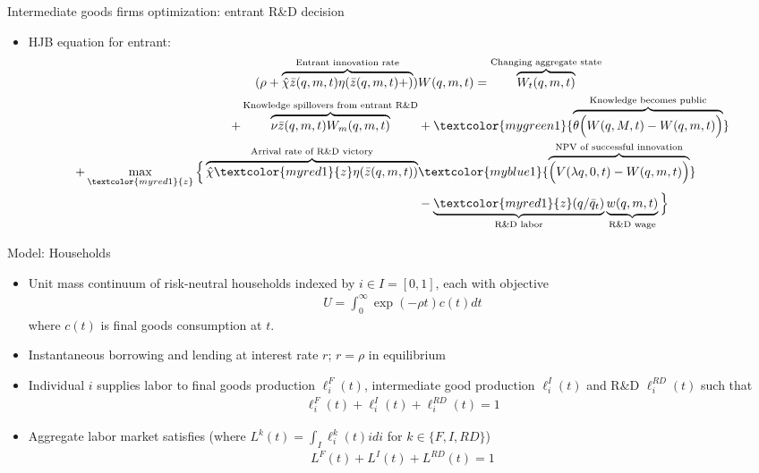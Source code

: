 \documentclass[english,usenames,dvipsnames]{beamer}
\begin{document}
\begin{frame}{Intermediate goods firms optimization: entrant R\&D decision}
\begin{itemize}
	\item HJB equation for entrant: 
	\footnotesize
	\begin{align*}
	(\rho +  \overbrace{\hat{\chi} \bar{z}(q,m,t)\eta(\bar{z}(q,m,t)+ )}^{\text{Entrant innovation rate}}) & W(q,m,t) = \overbrace{W_t(q,m,t)}^{\text{Changing aggregate state}} \\
	 + \overbrace{\nu \bar{z}(q,m,t) W_m(q,m,t)}^{\text{Knowledge spillovers from entrant R\&D}} &+ \textcolor{mygreen1}{\overbrace{\theta \Big(W(q,M,t) - W(q,m,t)\Big)}^{\text{Knowledge becomes public}}} \\
	 + \max_{\textcolor{myred1}{z}} \Big \{ \overbrace{\hat{\chi} {\textcolor{myred1}{z}} \eta(\bar{z}(q,m,t))}^{\text{Arrival rate of R\&D victory}} & \textcolor{myblue1}{\overbrace{\Big( V(\lambda q,0,t) - W(q,m,t) \Big)}^{\text{NPV of successful innovation}}} \\
	& - \underbrace{\textcolor{myred1}{z}(q/\bar{q}_t)}_{\text{R\&D labor}} \underbrace{w(q,m,t)}_{\text{R\&D wage}}  \Big\}
	\end{align*}
\end{itemize}
\end{frame}

\begin{frame}{Model: Households}
\begin{itemize}
	\item Unit mass continuum of risk-neutral households indexed by $i\in I =[0,1]$, each with objective
	\begin{align*}
	U = \int_0^{\infty}\exp(-\rho t)c(t)dt
	\end{align*}
	where $c(t)$ is final goods consumption at $t$.
	\item Instantaneous borrowing and lending at interest rate $r$; $r = \rho$ in equilibrium
	\item Individual $i$ supplies labor to final goods production $\ell^F_i (t)$, intermediate good production $\ell^I_i (t)$ and R\&D $\ell_i^{RD} (t)$ such that 
	\begin{align*}
	\ell_i^F(t)+ \ell_i^I(t) + \ell_i^{RD}(t) = 1
	\end{align*}
	\item Aggregate labor market satisfies (where $L^k(t) = \int_I \ell_i^k(t) idi$ for $k\in\{F,I,RD\}$)
	\begin{align*}
	L^F(t) + L^I(t) + L^{RD}(t) = 1
	\end{align*}
\end{itemize}
\end{frame}
\end{document}

